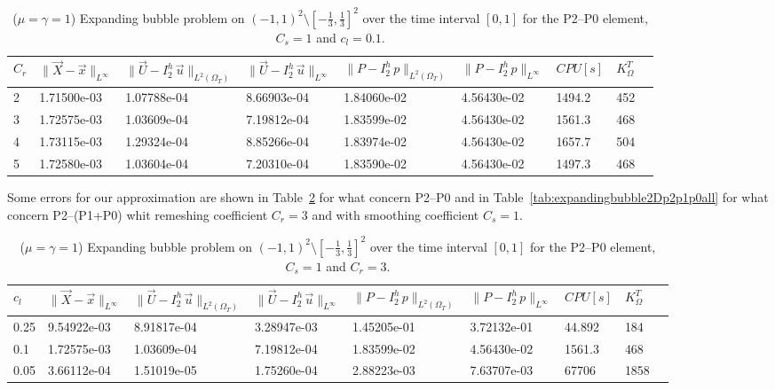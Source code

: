 \documentclass[a4paper,12pt,onecolumn]{article}
\newcommand{\errorXx}{\|\vec{X} - \vec{x}\|_{L^\infty}}
\newcommand{\LerrorUu}[1]{\|\vec U - I^h_{#1}\,\vec u\|_{L^2(\Omega_T)}}
\newcommand{\errorUu}[1]{\|\vec U - I^h_{#1}\,\vec u\|_{L^\infty}}
\newcommand{\errorPp}[1]{\|P - I^h_{#1}\,p\|_{L^\infty}}
\newcommand{\LerrorPp}[1]{\|P - I^h_{#1}\,p\|_{L^2(\Omega_T)}}
\begin{document}
\begin{table}
 \center
 \hspace*{-2cm}
\begin{tabular}{lllllllll}
\hline
$C_r$ & $\errorXx$ & $\LerrorUu2$ & $\errorUu2$ & $\LerrorPp2$ & $\errorPp2$ & $CPU[s]$ & $K_\Omega^T$\\
\hline
2 & 1.71500e-03 & 1.07788e-04 & 8.66903e-04 & 1.84060e-02 & 4.56430e-02 & 1494.2 & 452\\
3 & 1.72575e-03 & 1.03609e-04 & 7.19812e-04 & 1.83599e-02 & 4.56430e-02 & 1561.3 & 468\\
4 & 1.73115e-03 & 1.29324e-04 & 8.85266e-04 & 1.83974e-02 & 4.56430e-02 & 1657.7 & 504\\
5 & 1.72580e-03 & 1.03604e-04 & 7.20310e-04 & 1.83590e-02 & 4.56430e-02 & 1497.3 & 468\\
\hline
\end{tabular}
\hspace*{-2cm}
\caption{($\mu=\gamma=1$) Expanding bubble problem on $(-1,1)^2\setminus[-\frac{1}{3},\frac{1}{3}]^2$ over the time interval $[0,1]$ for the P2--P0 element, $C_s=1$ and $c_l=0.1$.}
\label{tab:expandingbubble2Dp2p0bothdiffcr}
\end{table}

Some errors for our approximation are shown in Table~\ref{tab:expandingbubble2Dp2p0all} for what concern P2--P0 and in Table~\ref{tab:expandingbubble2Dp2p1p0all} for what concern P2--(P1+P0) whit remeshing coefficient $C_r=3$ and with smoothing coefficient $C_s=1$.

\begin{table}
 \center
 \hspace*{-2cm}
\begin{tabular}{lllllllll}
\hline
$c_l$ & $\errorXx$ & $\LerrorUu2$ & $\errorUu2$ & $\LerrorPp2$ & $\errorPp2$ & $CPU[s]$ & $K_\Omega^T$\\
\hline
0.25 & 9.54922e-03 & 8.91817e-04 & 3.28947e-03 & 1.45205e-01 & 3.72132e-01 & 44.892 & 184\\
0.1 & 1.72575e-03 & 1.03609e-04 & 7.19812e-04 & 1.83599e-02 & 4.56430e-02 & 1561.3 & 468\\
0.05 & 3.66112e-04 & 1.51019e-05 & 1.75260e-04 & 2.88223e-03 & 7.63707e-03 & 67706 & 1858\\%
\hline
\end{tabular}
\hspace*{-2cm}
\caption{($\mu=\gamma=1$) Expanding bubble problem on $(-1,1)^2\setminus[-\frac{1}{3},\frac{1}{3}]^2$ over the time interval $[0,1]$ for the P2--P0 element, $C_s=1$ and $C_r=3$.}
\label{tab:expandingbubble2Dp2p0all}
\end{table}
\end{document}
